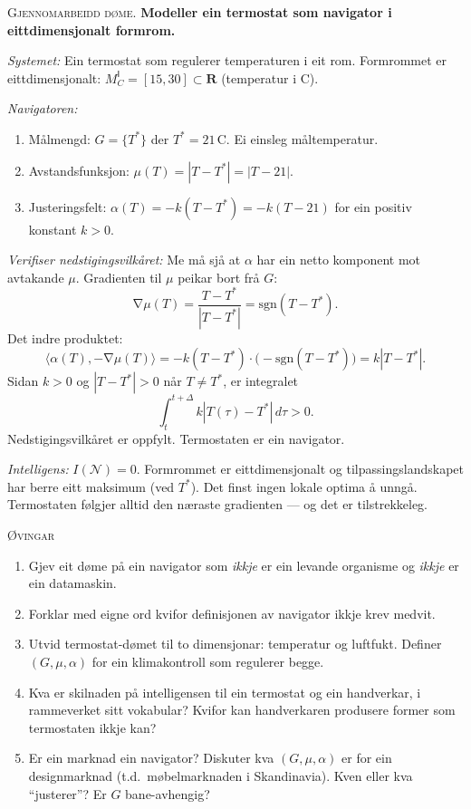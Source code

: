\documentclass[10pt]{book}
\theoremstyle{definition}
\theoremstyle{plain}
\theoremstyle{remark}
\newenvironment{gjennomgang}%
  {\medskip\noindent\textsc{Gjennomarbeidd d\o me.}\enspace}%
  {\medskip}
\newenvironment{ovingar}%
  {\medskip\noindent\textsc{\O vingar}\begin{enumerate}[leftmargin=2em]}%
  {\end{enumerate}\medskip}
\newcommand{\MC}{M^{\mathsf{I}}_C}
\providecommand{\R}{}
\renewcommand{\R}{\mathbf{R}}
\newcommand{\Nav}{\mathcal{N}}
\newcommand{\inner}[2]{\langle #1, #2 \rangle}
\DeclareMathOperator{\grad}{\nabla}
\begin{document}
\begin{gjennomgang}
\textbf{Modeller ein termostat som navigator i eittdimensjonalt formrom.}

\textit{Systemet:} Ein termostat som regulerer temperaturen i eit rom. Formrommet er eittdimensjonalt: $\MC = [15, 30] \subset \R$ (temperatur i \textdegree C).

\textit{Navigatoren:}
\begin{enumerate}[label=(\alph*)]
  \item M\aa lmengd: $G = \{T^*\}$ der $T^* = 21$\,\textdegree C. Ei einsleg m\aa ltemperatur.
  \item Avstandsfunksjon: $\mu(T) = |T - T^*| = |T - 21|$.
  \item Justeringsfelt: $\alpha(T) = -k(T - T^*) = -k(T - 21)$ for ein positiv konstant $k > 0$.
\end{enumerate}

\textit{Verifiser nedstigingsvilk\aa ret:} Me m\aa{} sj\aa{} at $\alpha$ har ein netto komponent mot avtakande $\mu$. Gradienten til $\mu$ peikar bort fr\aa{} $G$:
\[
  \grad\mu(T) = \frac{T - T^*}{|T - T^*|} = \text{sgn}(T - T^*).
\]
Det indre produktet:
\[
  \inner{\alpha(T)}{-\grad\mu(T)} = -k(T - T^*) \cdot \bigl(-\text{sgn}(T - T^*)\bigr) = k|T - T^*|.
\]
Sidan $k > 0$ og $|T - T^*| > 0$ n\aa r $T \neq T^*$, er integralet
\[
  \int_t^{t+\Delta} k|T(\tau) - T^*| \, d\tau > 0.
\]
Nedstigingsvilk\aa ret er oppfylt. Termostaten er ein navigator.

\textit{Intelligens:} $I(\Nav) = 0$. Formrommet er eittdimensjonalt og tilpassingslandskapet har berre eitt maksimum (ved $T^*$). Det finst ingen lokale optima \aa{} unng\aa. Termostaten f\o lgjer alltid den n\ae raste gradienten --- og det er tilstrekkeleg.
\end{gjennomgang}

\begin{ovingar}
  \item[\textbf{a)}] Gjev eit d\o me p\aa{} ein navigator som \emph{ikkje} er ein levande organisme og \emph{ikkje} er ein datamaskin.
  \item[\textbf{a)}] Forklar med eigne ord kvifor definisjonen av navigator ikkje krev medvit.
  \item[\textbf{b)}] Utvid termostat-d\o met til to dimensjonar: temperatur og luftfukt. Definer $(G, \mu, \alpha)$ for ein klimakontroll som regulerer begge.
  \item[\textbf{b)}] Kva er skilnaden p\aa{} intelligensen til ein termostat og ein handverkar, i ramm\-everket sitt vokabular? Kvifor kan handverkaren produsere former som termostaten ikkje kan?
  \item[\textbf{c)}] Er ein marknad ein navigator? Diskuter kva $(G, \mu, \alpha)$ er for ein designmarknad (t.d.\ m\o belmarknaden i Skandinavia). Kven eller kva ``justerer''? Er $G$ bane-avhengig?
\end{ovingar}
\end{document}
